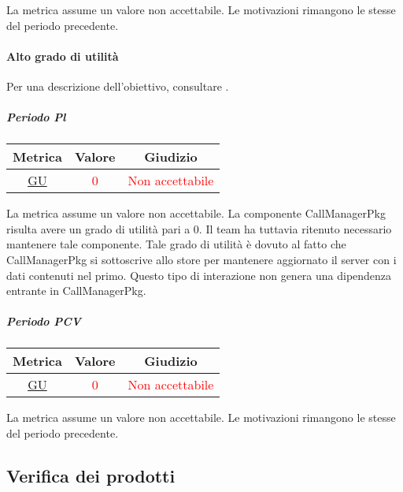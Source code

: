 				La metrica assume un valore non accettabile. Le motivazioni rimangono le stesse del periodo precedente.
				
				\newpage
				\paragraph{Alto grado di utilità}
					Per una descrizione dell'obiettivo, consultare .
					\subparagraph{Periodo Pl}
					
					\begin{table}[H]
						\centering
						\begin{tabular}{  c | c | c}
							\hline
							\textbf{Metrica} & \textbf{Valore} & \textbf{Giudizio} \\
							\hline
						 \hyperref[MMC]{GU}   & \textcolor{Red}{0}          & \textcolor{Red}{Non accettabile}  \\ \hline
						\end{tabular} 
					\end{table}
				
		La metrica assume un valore non accettabile. La componente CallManagerPkg risulta avere un
		grado di utilità pari a 0. Il team ha tuttavia ritenuto necessario mantenere tale componente. Tale
		grado di utilità è dovuto al fatto che CallManagerPkg si sottoscrive allo store per mantenere
		aggiornato il server con i dati contenuti nel primo. Questo tipo di interazione non genera una
		dipendenza entrante in CallManagerPkg.
				
	
				\subparagraph{Periodo PCV}
				
				\begin{table}[H]
					\centering
					\begin{tabular}{  c | c | c}
						\hline
						\textbf{Metrica} & \textbf{Valore} & \textbf{Giudizio} \\
						\hline
						\hyperref[MMC]{GU}   & \textcolor{Red}{0}          & \textcolor{Red}{Non accettabile}  \\ \hline
					\end{tabular} 
				\end{table}
				
				La metrica assume un valore non accettabile. Le motivazioni rimangono le stesse del periodo precedente.
				
				\newpage
			\subsection{Verifica dei prodotti}
